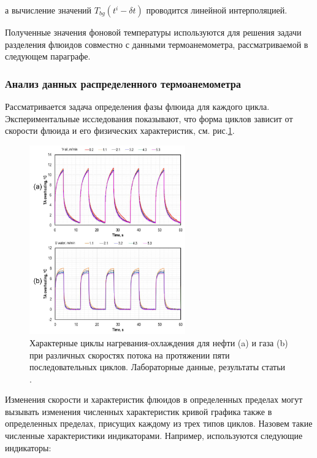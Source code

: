 а вычисление значений $T_{bg}(t^i-\delta t)$ проводится линейной интерполяцией.

\par
Полученные значения фоновой температуры используются для решения задачи разделения флюидов совместно с данными термоанемометра, рассматриваемой в следующем параграфе.

\subsubsection{Анализ данных распределенного термоанемометра}
\par
Рассматривается задача определения фазы флюида для каждого цикла. Экспериментальные исследования показывают, что форма циклов зависит от скорости флюида и его физических характеристик, см. рис.\ref{fig:cycle_examples_dem}.

\begin{figure}[H]
\centering
\includegraphics[width=0.6\textwidth]{TA/cycle_examples_dem.png}
\caption{Характерные циклы нагревания-охлаждения для нефти (a) и газа (b) при различных скоростях потока на протяжении пяти последовательных циклов. Лабораторные данные, результаты статьи \cite{horizonal_1}.}
\label{fig:cycle_examples_dem}
\end{figure}

\par
Изменения скорости и характеристик флюидов в определенных пределах могут вызывать изменения численных характеристик кривой графика также в определенных пределах, присущих каждому из трех типов циклов. Назовем такие численные характеристики индикаторами. Например, используются следующие индикаторы:

